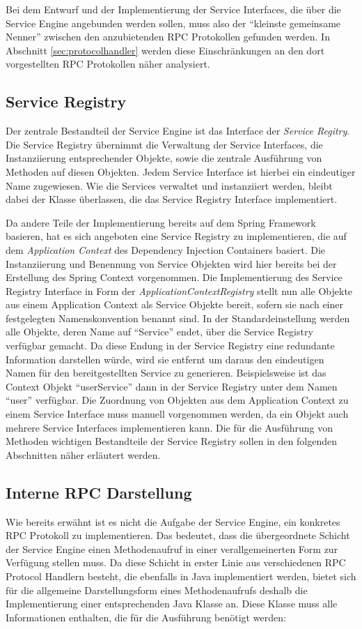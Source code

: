 Bei dem Entwurf und der Implementierung der Service Interfaces, die über die
Service Engine angebunden werden sollen, muss also der "`kleinste gemeinsame
Nenner"' zwischen den anzubietenden \ac{RPC} Protokollen gefunden werden. In
Abschnitt \ref{sec:protocolhandler} werden diese Einschränkungen an den dort
vorgestellten \ac{RPC} Protokollen näher analysiert.

\subsection{Service Registry}
Der zentrale Bestandteil der Service Engine ist das Interface der \emph{Service
Regitry}. Die Service Registry übernimmt die Verwaltung der Service Interfaces,
die Instanziierung entsprechender Objekte, sowie die zentrale Ausführung von
Methoden auf diesen Objekten. Jedem Service Interface ist hierbei ein eindeutiger
Name zugewiesen. Wie die Services verwaltet und instanziiert werden, bleibt
dabei der Klasse überlassen, die das Service Registry Interface implementiert. 

Da andere Teile der Implementierung bereits auf dem Spring Framework basieren,
hat es sich angeboten eine Service Registry zu implementieren, die auf dem
\emph{Application Context} des Dependency Injection Containers basiert. Die
Instanziierung und Benennung von Service Objekten wird hier bereits bei der
Erstellung des Spring Context vorgenommen. Die Implementierung des Service
Registry Interface in Form der \emph{ApplicationContextRegistry} stellt nun alle
Objekte aus einem Application Context als Service Objekte bereit, sofern sie nach
einer festgelegten Namenskonvention benannt sind. In der Standardeinstellung
werden alle Objekte, deren Name auf "`Service"' endet, über die Service Registry
verfügbar gemacht. Da diese Endung in der Service Registry eine redundante
Information darstellen würde, wird sie entfernt um daraus den eindeutigen Namen
für den bereitgestellten Service zu generieren. Beispielsweise ist das Context
Objekt "`userService"' dann in der Service Registry unter dem Namen "`user"'
verfügbar. Die Zuordnung von Objekten aus dem Application Context zu einem
Service Interface muss manuell vorgenommen werden, da ein Objekt auch mehrere
Service Interfaces implementieren kann. Die für die Ausführung von Methoden
wichtigen Bestandteile der Service Registry sollen in den folgenden Abschnitten
näher erläutert werden.

\subsection{Interne RPC Darstellung}
Wie bereits erwähnt ist es nicht die Aufgabe der Service Engine, ein konkretes
\ac{RPC} Protokoll zu implementieren. Das bedeutet, dass die übergeordnete
Schicht der Service Engine einen Methodenaufruf in einer verallgemeinerten Form
zur Verfügung stellen muss. Da diese Schicht in erster Linie aus
verschiedenen \ac{RPC} Protocol Handlern besteht, die ebenfalls in Java
implementiert werden, bietet sich für die allgemeine Darstellungsform eines Methodenaufrufs
deshalb die Implementierung einer entsprechenden Java Klasse an. Diese Klasse
muss alle Informationen enthalten, die für die Ausführung
benötigt werden:

